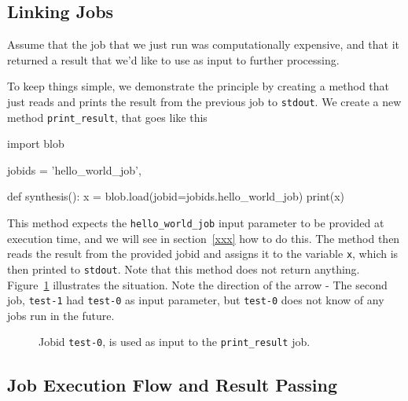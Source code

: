 \subsection{Linking Jobs}
Assume that the job that we just run was computationally expensive,
and that it returned a result that we'd like to use as input to further
processing.

To keep things simple, we demonstrate the principle by creating a
method that just reads and prints the result from the previous job to
\texttt{stdout}.  We create a new method \texttt{print\_result}, that
goes like this

\begin{python}
import blob

jobids = {'hello_world_job',}

def synthesis():
    x = blob.load(jobid=jobids.hello_world_job)
    print(x)
\end{python}

This method expects the \texttt{hello\_world\_job} input parameter to
be provided at execution time, and we will see in section~\ref{xxx}
how to do this.  The method then reads the result from the provided
jobid and assigns it to the variable \texttt{x}, which is then printed
to \texttt{stdout}.  Note that this method does not return anything.
Figure~\ref{fig:execflow-print-result} illustrates the situation.
Note the direction of the arrow - The second job, \texttt{test-1} had
\texttt{test-0} as input parameter, but \texttt{test-0} does not know
of any jobs run in the future.

\begin{figure}[h!]
  \begin{center}
    
    \caption{Jobid \texttt{test-0}, is used as input to the
      \texttt{print\_result} job.}
    \label{fig:execflow-print-result}
  \end{center}
\end{figure}

\subsection{Job Execution Flow and Result Passing}

